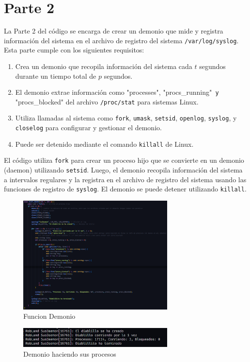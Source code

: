 \documentclass[12pt]{article}
\begin{document}
\section{Parte 2}

La Parte 2 del código se encarga de crear un demonio que mide y registra información del sistema en el archivo de registro del sistema \texttt{/var/log/syslog}. Esta parte cumple con los siguientes requisitos:

\begin{enumerate}
\item Crea un demonio que recopila información del sistema cada $t$ segundos durante un tiempo total de $p$ segundos.
\item El demonio extrae información como "processes", "procs\_running"\texttt{ y} "procs\_blocked" del archivo \texttt{/proc/stat} para sistemas Linux.
\item Utiliza llamadas al sistema como \texttt{fork}, \texttt{umask}, \texttt{setsid}, \texttt{openlog}, \texttt{syslog}, y \texttt{closelog} para configurar y gestionar el demonio.
\item Puede ser detenido mediante el comando \texttt{killall} de Linux.
\end{enumerate}

El código utiliza \texttt{fork} para crear un proceso hijo que se convierte en un demonio (daemon) utilizando \texttt{setsid}. Luego, el demonio recopila información del sistema a intervalos regulares y la registra en el archivo de registro del sistema usando las funciones de registro de \texttt{syslog}. El demonio se puede detener utilizando \texttt{killall}.
\begin{figure}[H]
    \centering
    \includegraphics[width=0.7\textwidth]{daemon.png}
    \caption{Funcion Demonio}
\end{figure}
\begin{figure}[H]
    \centering
    \includegraphics[width=0.7\textwidth]{demonio-working.jpeg}
    \caption{Demonio haciendo sus procesos}
\end{figure}
\end{document}
